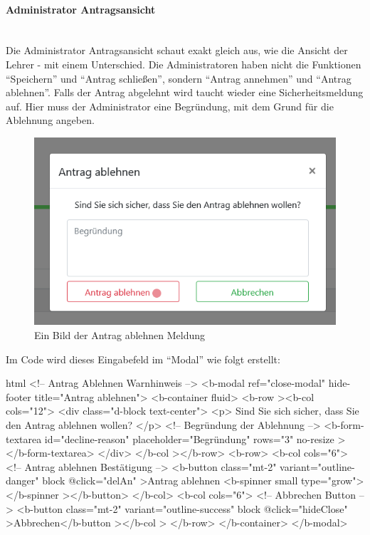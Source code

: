 \paragraph{Administrator Antragsansicht}
~\\
Die Administrator Antragsansicht schaut exakt gleich aus, wie die Ansicht der Lehrer - mit einem Unterschied. Die Administratoren haben nicht die Funktionen \enquote{Speichern} und \enquote{Antrag schließen}, sondern \enquote{Antrag annehmen} und \enquote{Antrag ablehnen}. Falls der Antrag abgelehnt wird taucht wieder eine Sicherheitsmeldung auf. Hier muss der Administrator eine Begründung, mit dem Grund für die Ablehnung angeben. 
\begin{figure}[H]
	\centering
	\includegraphics[width=0.6\linewidth]{images/website/admin_antrag_schiessen}
	\caption[Aktiv]{Ein Bild der Antrag ablehnen Meldung}
	\label{fig:adminclose}
\end{figure}
Im Code wird dieses Eingabefeld im \enquote{Modal} wie folgt erstellt:
\begin{code}{html}
	<!-- Antrag Ablehnen Warnhinweis -->
    <b-modal ref="close-modal" hide-footer title="Antrag ablehnen">
      <b-container fluid>
        <b-row
          ><b-col cols="12">
            <div class="d-block text-center">
              <p>
                Sind Sie sich sicher, dass Sie den Antrag ablehnen wollen?
              </p>
              <!-- Begründung der Ablehnung -->
              <b-form-textarea
                id="decline-reason"
                placeholder="Begründung"
                rows="3"
                no-resize
              ></b-form-textarea>
            </div> </b-col
        ></b-row>
        <b-row>
          <b-col cols="6">
            <!-- Antrag ablehnen Bestätigung -->
            <b-button class="mt-2" variant="outline-danger" block @click="delAn"
              >Antrag ablehnen <b-spinner small type="grow"></b-spinner
            ></b-button>
          </b-col>
          <b-col cols="6">
            <!-- Abbrechen Button -->
            <b-button
              class="mt-2"
              variant="outline-success"
              block
              @click="hideClose"
              >Abbrechen</b-button
            ></b-col
          >
        </b-row>
      </b-container>
    </b-modal>
\end{code}
	\label{list:badgebsp} ~\\
\newpage
